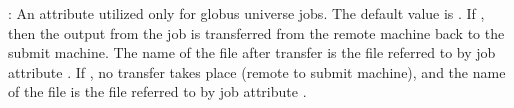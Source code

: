 \begin{description}
\item[\AdAttr{TransferOut}] :  
An attribute utilized only for globus universe jobs.
The default value is .
If , then the output from the job
is transferred from the remote machine back to the submit machine.
The name of the file after transfer is the file referred to
by job attribute .
If , no transfer takes place (remote to submit machine),
and the name of the file is the file referred to
by job attribute .

\end{description}
